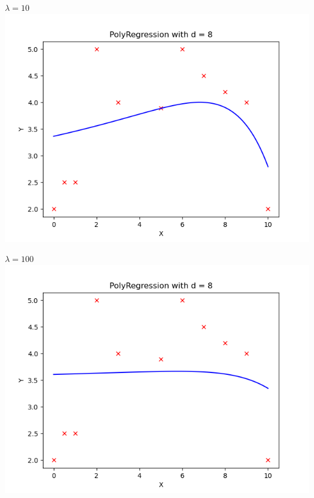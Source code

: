 \documentclass{article}
\begin{document}
\begin{aprob}
\begin{tcolorbox}[colback=lightgray!10!white, colframe=black, title=A3]
\begin{center}
        \begin{minipage}{0.45\textwidth}
            \centering
            \textbf{$\lambda = 10$} \\[0.3em]
            \includegraphics[width=\textwidth]{PolyRegression10Regularization.png}
        \end{minipage}
        \hfill
        \begin{minipage}{0.45\textwidth}
            \centering
            \textbf{$\lambda = 100$} \\[0.3em]
            \includegraphics[width=\textwidth]{PolyRegression100Regularization.png}
        \end{minipage}
        \end{center}
    \end{tcolorbox}
\end{aprob}
\end{document}
